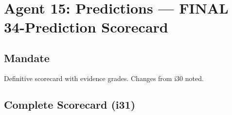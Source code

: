 \documentclass[11pt,a4paper]{article}
\begin{document}
\section{Agent 15: Predictions --- FINAL 34-Prediction Scorecard}

\subsection{Mandate}
Definitive scorecard with evidence grades. Changes from i30 noted.

\subsection{Complete Scorecard (i31)}
\end{document}
